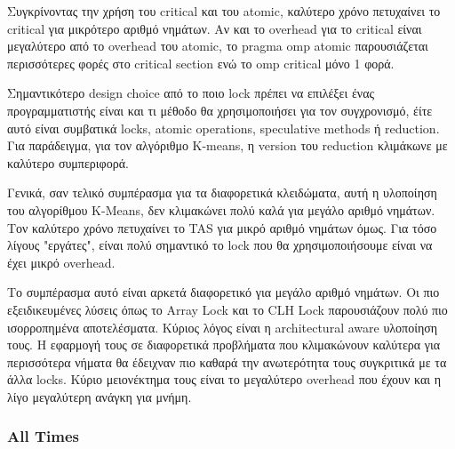 \documentclass[../final_report.tex]{subfiles}
\begin{document}
Συγκρίνοντας την χρήση του critical και του atomic, καλύτερο χρόνο πετυχαίνει το critical για μικρότερο αριθμό
νημάτων. Αν και το overhead για το critical είναι μεγαλύτερο από το overhead του atomic, το pragma omp atomic 
παρουσιάζεται περισσότερες φορές στο critical section ενώ το omp critical μόνο 1 φορά. 

Σημαντικότερο design choice από το ποιο lock πρέπει να επιλέξει ένας προγραμματιστής είναι και τι μέθοδο θα χρησιμοποιήσει
για τον συγχρονισμό, έίτε αυτό είναι συμβατικά locks, atomic operations, speculative methods ή reduction.
Για παράδειγμα, για τον αλγόριθμο K-means, η version του reduction κλιμάκωνε με καλύτερο συμπεριφορά.

Γενικά, σαν τελικό συμπέρασμα για τα διαφορετικά κλειδώματα, αυτή η υλοποίηση του αλγορίθμου K-Means, 
δεν κλιμακώνει πολύ καλά για μεγάλο αριθμό νημάτων. Τον καλύτερο χρόνο πετυχαίνει το TAS για μικρό αριθμό
νημάτων όμως. Για τόσο λίγους "εργάτες", είναι πολύ σημαντικό το lock που θα χρησιμοποιήσουμε είναι να έχει μικρό
overhead. 

Το συμπέρασμα αυτό είναι αρκετά διαφορετικό για μεγάλο αριθμό νημάτων. Οι πιο εξειδικευμένες λύσεις όπως το 
Array Lock και το CLH Lock παρουσιάζουν πολύ πιο ισορροπημένα αποτελέσματα. Κύριος λόγος είναι η architectural aware
υλοποίηση τους. Η εφαρμογή τους σε διαφορετικά προβλήματα που κλιμακώνουν καλύτερα για περισσότερα νήματα θα έδειχναν
πιο καθαρά την ανωτερότητα τους συγκριτικά με τα άλλα locks. Κύριο μειονέκτημα τους είναι το μεγαλύτερο overhead που έχουν και η 
λίγο μεγαλύτερη ανάγκη για μνήμη.

\subsubsection*{All Times}
\end{document}
